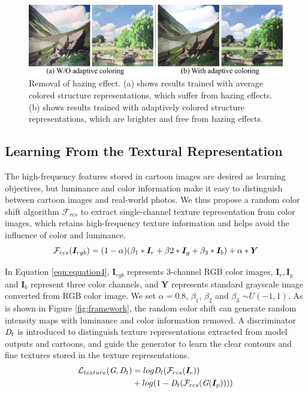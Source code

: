 \documentclass[10pt,twocolumn,letterpaper]{article}
\begin{document}
\begin{figure}[t]
\centering
\includegraphics[width=\linewidth]{imgs/hazing.pdf}
\caption{Removal of hazing effect. (a) shows results trained with average colored structure representations, which suffer from hazing effects. (b) shows results trained with adaptively colored structure representations, which are brighter and free from hazing effects.}
\label{fig:hazing}
\vspace{-0.5em}
\end{figure}

\subsection{Learning From the Textural Representation}
The high-frequency features stored in cartoon images are desired as learning objectives, but luminance and color information make it easy to distinguish between cartoon images and real-world photos. We thus propose a random color shift algorithm $\mathcal{F}_{rcs}$ to extract single-channel texture representation from color images, which retains high-frequency texture information and helps avoid the influence of color and luminance.
\begin{equation}
\vspace{-0.3em}
\mathcal{F}_{rcs}(\bm{I}_{rgb}) = (1-\alpha)(\beta_1*\bm{I}_r + \beta2 *\bm{I}_g + \beta_3 *\bm{I}_b)+\alpha*\bm{Y}
\label{eqn:equation4}
\end{equation}

In Equation \ref{eqn:equation4}, $\bm{I}_{rgb}$ represents 3-channel RGB color images, $\bm{I}_{r}, \bm{I}_{g}$ and $\bm{I}_{b}$ represent three color channels, and $\bm{Y}$ represents standard grayscale image converted from RGB color image. We set $\alpha=0.8$, $\beta_1$, $\beta_2$ and $\beta_3$ $\sim U(-1, 1)$. As is shown in Figure \ref{fig:framework}, the random color shift can generate random intensity maps with luminance and color information removed. A discriminator $\textit D_{t}$ is introduced to distinguish texture representations extracted from model outputs and cartoons, and guide the generator to learn the clear contours and fine textures stored in the texture representations. 
\begin{equation}
\vspace{-0.5em}
\begin{aligned}
\mathcal{L}_{texture}(\textit G, \textit D_{t}) &= log\textit D_{t}({\mathcal{F}_{rcs}}(\bm{I}_c))\\
&+log(1-\textit D_{t}(\mathcal{F}_{rcs}(\textit G(\bm{I}_p))))
\end{aligned}
\label{eqn:equation5}
\end{equation}
\end{document}
